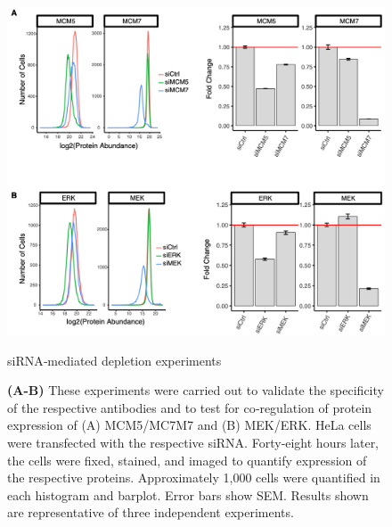 \begin{figure}[hbt!]
\centering
\includegraphics[width=14cm, keepaspectratio]{figs/paper1/figS6.png}
\caption{siRNA‐mediated depletion experiments}
\caption*{\textbf{(A-B)} These experiments were carried out to validate the specificity of the respective antibodies and to test for co‐regulation of protein expression of (A) MCM5/MC7M7 and (B) MEK/ERK. HeLa cells were transfected with the respective siRNA. Forty‐eight hours later, the cells were fixed, stained, and imaged to quantify expression of the respective proteins. Approximately 1,000 cells were quantified in each histogram and barplot. Error bars show SEM. Results shown are representative of three independent experiments.
}
\label{fig:paper1_figS6}
\end{figure}


